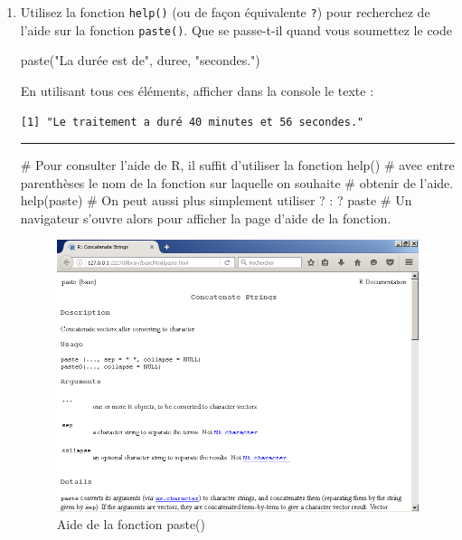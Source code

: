 \documentclass[12pt,twosided, notitlepage]{book}
\newenvironment{Shaded}{}{}
\newcommand{\KeywordTok}[1]{\textcolor[rgb]{0.00,0.00,1.00}{#1}}
\newcommand{\StringTok}[1]{\textcolor[rgb]{0.00,0.50,0.50}{#1}}
\newcommand{\CommentTok}[1]{\textcolor[rgb]{0.00,0.50,0.00}{#1}}
\newcommand{\NormalTok}[1]{#1}
\newif \ifsol
\renewenvironment{Shaded}{\begin{snugshade}}{\end{snugshade}}
\begin{document}
\begin{enumerate}
  \bigskip  \fi 
\item
  Utilisez la fonction \texttt{help()} (ou de façon équivalente
  \texttt{?}) pour recherchez de l'aide sur la fonction
  \texttt{paste()}.
  Que se passe-t-il quand vous soumettez le code

\begin{Shaded}
\begin{Highlighting}[]
\KeywordTok{paste}\NormalTok{(}\StringTok{"La durée est de"}\NormalTok{, duree, }\StringTok{"secondes."}\NormalTok{)}
\end{Highlighting}
\end{Shaded}

  En utilisant tous ces éléments, afficher dans la console le texte :

\begin{verbatim}
[1] "Le traitement a duré 40 minutes et 56 secondes."
\end{verbatim}

  \ifsol 

  \begin{center} \rule{0.5\linewidth}{\linethickness}\end{center}

\begin{Shaded}
\begin{Highlighting}[]
\CommentTok{# Pour consulter l'aide de R, il suffit d'utiliser la fonction help()}
\CommentTok{# avec entre parenthèses le nom de la fonction sur laquelle on souhaite}
\CommentTok{# obtenir de l'aide. }
\KeywordTok{help}\NormalTok{(paste)}
\CommentTok{# On peut aussi plus simplement utiliser ? :}
\NormalTok{? paste}
\CommentTok{# Un navigateur s'ouvre alors pour afficher la page d'aide de la fonction.}
\end{Highlighting}
\end{Shaded}

  \begin{figure}
  \centering
  \includegraphics{../figures/Aide_paste.png}
  \caption{Aide de la fonction paste()}
  \end{figure}


\end{enumerate}
\end{document}
